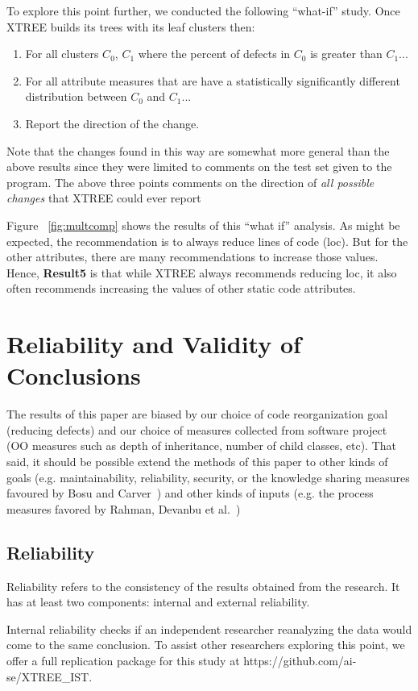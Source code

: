 \documentclass[twocolumn,5p]{elsarticle}
\newcommand{\be}{\begin{enumerate}}
\newcommand{\ee}{\end{enumerate}}
\theoremstyle{break}
\begin{document}
\begin{itemize}
		To explore this point further, we conducted the following ``what-if'' study. Once XTREE builds its trees with its leaf clusters then:
		\be
		\item For all clusters $C_0$, $C_1$ where the percent of defects in $C_0$ is greater than $C_1$...
		\item For all attribute measures that are have a statistically significantly different distribution  between $C_0$ and $C_1$...
		\item Report the direction of the change.
		\ee
		Note that the changes found in this way are somewhat more general than the above results
		since they were  limited
		to comments on the test set given to the program. The above three points comments on the direction of {\em all possible changes}
		that XTREE could ever report
		
		
		Figure ~\ref{fig:multcomp} shows the results of this ``what if'' analysis. As might be expected, the recommendation is to
		always reduce lines of code (loc). But for the other attributes, there are many recommendations to increase those values.
		Hence, {\bf Result5} is that while XTREE always  recommends reducing loc,
		it also   often recommends increasing the values of other static code attributes.   
		

\section{Reliability and Validity of Conclusions}
\label{sect:valid}

The results of this paper are biased by our choice of code reorganization 
goal (reducing defects) and our choice of measures collected from software 
project (OO measures such as depth of inheritance, number of child classes, 
etc). That said, it should be possible extend the methods of this paper to other 
kinds of goals (e.g. maintainability, reliability, security, or the knowledge sharing
measures favoured by Bosu and Carver~\cite{bosu13}) and other kinds of 
inputs (e.g. the process measures favored by Rahman, 
Devanbu et al.~\cite{Rahman2013}) 

\subsection{Reliability}
Reliability refers to the consistency of the results obtained
from the research. It has at least two components: internal
and external reliability.

Internal reliability checks if an independent researcher
reanalyzing the data would come to the same conclusion. 
To assist other researchers exploring this point, we offer a full replication package for this study at  
https://github.com/ai-se/XTREE\_IST.


\end{itemize}
\end{document}
